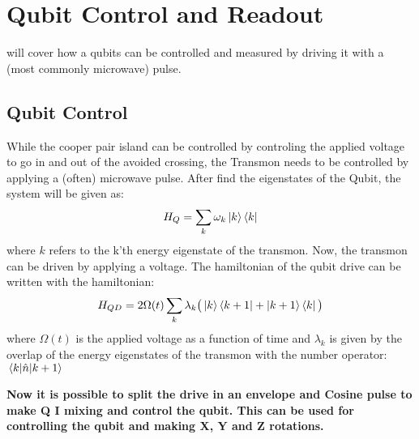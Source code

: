\chapter{Qubit Control and Readout}
 will cover how a qubits can be controlled and measured by driving it with a (most commonly microwave) pulse. 


\section{Qubit Control}
While the cooper pair island can be controlled by controling the applied voltage to go in and out of the avoided crossing, the Transmon needs to be controlled by applying a (often) microwave pulse. After find the eigenstates of the Qubit, the system will be given as:
\begin{equation}
    H_Q = \sum_k \omega_k \ket{k}\bra{k}
\end{equation}
where $k$ refers to the k'th energy eigenstate of the transmon. Now, the transmon can be driven by applying a voltage. The hamiltonian of the qubit drive can be written with the hamiltonian:
\begin{equation}
    H_{QD} = 2 \Omega(t) \sum_k \lambda_k \big(\ket{k}\bra{k + 1} + \ket{k + 1}\bra{k} \big)
\end{equation}
where $\Omega(t)$ is the applied voltage as a function of time and $\lambda_k$ is given by the overlap of the energy eigenstates of the transmon with the number operator: $\matrixel{k}{\hat{n}}{k+1}$ 

\textbf{Now it is possible to split the drive in an envelope and Cosine pulse to make Q I mixing and control the qubit. This can be used for controlling the qubit and making X, Y and Z rotations.}

